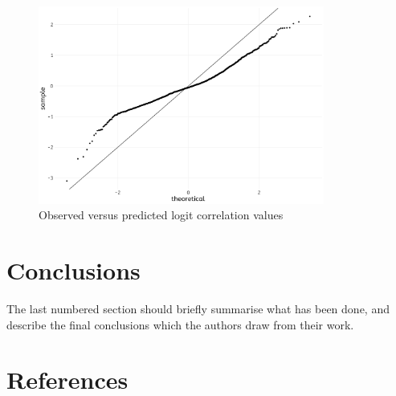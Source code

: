 \documentclass[]{elsarticle} %
\begin{document}
\begin{figure}
  \includegraphics[width=\columnwidth, height = 6.5cm]{figures/residuals-qq}
    \caption{Observed versus predicted logit correlation values}
    \label{fig:residuals-qq}
\end{figure}

\hypertarget{conclusions}{%
\section{Conclusions}\label{conclusions}}

The last numbered section should briefly summarise what has been done,
and describe the final conclusions which the authors draw from their
work.

\hypertarget{references}{%
\section*{References}\label{references}}
\end{document}
